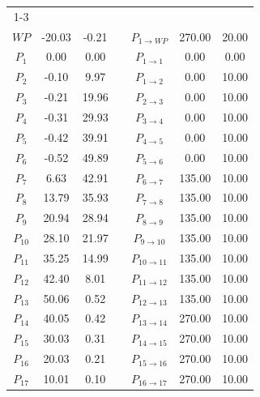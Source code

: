 \begin{itemize}
\begin{longtable}{ccc p{8mm} ccc}
                \cmidrule{1-3} \cmidrule{5-7}
                \multicolumn{7}{r}{{Continua nella pagina successiva}} \\
                \endfoot

                \cmidrule{1-3} \cmidrule{5-7}
                \endlastfoot

                $WP$ & -20.03 & -0.21 & & $P_{1 \rightarrow WP}$ & 270.00 & 20.00 \\
                $P_{1}$ & 0.00 & 0.00 & & $P_{1 \rightarrow 1}$ & 0.00 & 0.00 \\
                $P_{2}$ & -0.10 & 9.97 & & $P_{1 \rightarrow 2}$ & 0.00 & 10.00 \\
                $P_{3}$ & -0.21 & 19.96 & & $P_{2 \rightarrow 3}$ & 0.00 & 10.00 \\
                $P_{4}$ & -0.31 & 29.93 & & $P_{3 \rightarrow 4}$ & 0.00 & 10.00 \\
                $P_{5}$ & -0.42 & 39.91 & & $P_{4 \rightarrow 5}$ & 0.00 & 10.00 \\
                $P_{6}$ & -0.52 & 49.89 & & $P_{5 \rightarrow 6}$ & 0.00 & 10.00 \\
                $P_{7}$ & 6.63 & 42.91 & & $P_{6 \rightarrow 7}$ & 135.00 & 10.00 \\
                $P_{8}$ & 13.79 & 35.93 & & $P_{7 \rightarrow 8}$ & 135.00 & 10.00 \\
                $P_{9}$ & 20.94 & 28.94 & & $P_{8 \rightarrow 9}$ & 135.00 & 10.00 \\
                $P_{10}$ & 28.10 & 21.97 & & $P_{9 \rightarrow 10}$ & 135.00 & 10.00 \\
                $P_{11}$ & 35.25 & 14.99 & & $P_{10 \rightarrow 11}$ & 135.00 & 10.00 \\
                $P_{12}$ & 42.40 & 8.01 & & $P_{11 \rightarrow 12}$ & 135.00 & 10.00 \\
                $P_{13}$ & 50.06 & 0.52 & & $P_{12 \rightarrow 13}$ & 135.00 & 10.00 \\
                $P_{14}$ & 40.05 & 0.42 & & $P_{13 \rightarrow 14}$ & 270.00 & 10.00 \\
                $P_{15}$ & 30.03 & 0.31 & & $P_{14 \rightarrow 15}$ & 270.00 & 10.00 \\
                $P_{16}$ & 20.03 & 0.21 & & $P_{15 \rightarrow 16}$ & 270.00 & 10.00 \\
                $P_{17}$ & 10.01 & 0.10 & & $P_{16 \rightarrow 17}$ & 270.00 & 10.00 \\

        \end{longtable}
        
    \end{itemize}

